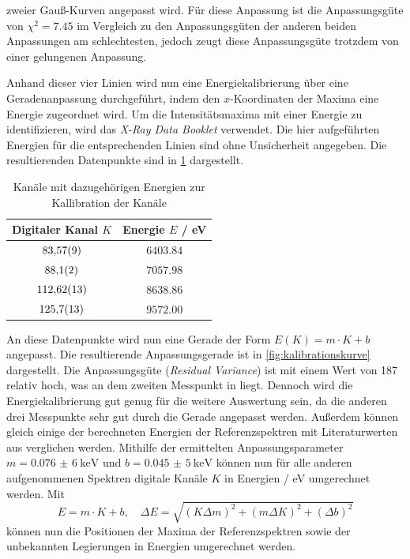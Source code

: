 zweier Gauß-Kurven angepasst wird. Für diese Anpassung ist die Anpassungsgüte von $\chi^2 = \num{7.45}$ im Vergleich zu den Anpassungsgüten der anderen
beiden Anpassungen am schlechtesten, jedoch zeugt diese Anpassungsgüte trotzdem von einer gelungenen Anpassung.\par
Anhand dieser vier Linien wird nun eine Energiekalibrierung über eine Geradenanpassung durchgeführt, indem den $x$-Koordinaten der Maxima eine
Energie zugeordnet wird. Um die Intensitätsmaxima mit einer Energie zu identifizieren, wird das \textit{X-Ray Data Booklet} \cite{xraydata} verwendet.
Die hier aufgeführten Energien für die entsprechenden Linien sind ohne Unsicherheit angegeben.
Die resultierenden Datenpunkte sind in \cref{tab:callibration} dargestellt.
\begin{table}[H]
   \centering
\caption{Kanäle mit dazugehörigen Energien zur Kallibration der Kanäle}
\begin{tabular}{c c}
\hline Digitaler Kanal $K$ & Energie $E$ / \unit{\electronvolt} \\ 
\hline
$\num{83.57\pm 0.09}$ & $\num{6403.84}$ \\
$\num{88.1\pm 0.2}$ & $\num{7057.98}$ \\
$\num{112.62\pm 0.13}$ & $\num{8638.86}$ \\
$\num{125.7\pm 1.3}$ & $\num{9572.00}$ \\
\hline\end{tabular}
\label{tab:callibration}
\end{table}
An diese Datenpunkte wird nun eine Gerade der Form $E(K) = m \cdot K + b$ angepasst. Die resultierende Anpassungsgerade ist in \cref{fig:kalibrationskurve}
dargestellt. Die Anpassungsgüte (\textit{Residual Variance}) ist mit einem Wert von 187 relativ hoch, was an dem zweiten Messpunkt in liegt.
Dennoch wird die Energiekalibrierung gut genug für die weitere Auswertung sein, da die anderen drei Messpunkte sehr gut durch die Gerade
angepasst werden. Außerdem können gleich einige der berechneten Energien der Referenzspektren mit Literaturwerten aus \cite{xraydata} verglichen werden.
Mithilfe der ermittelten Anpassungsparameter $m = \SI{0,076(6)}{\kilo \electronvolt}$ und $b = \SI{0,045(5)}{\kilo \electronvolt}$ können nun für alle anderen aufgenommenen Spektren digitale Kanäle $K$ in Energien
/ \unit{\electronvolt} umgerechnet werden. Mit
\begin{equation*}
    E = m \cdot K + b , \quad \Delta E = \sqrt{(K \Delta m)^2 + (m \Delta K)^2 + (\Delta b)^2}
\end{equation*} können nun die Positionen der Maxima der Referenzspektren sowie der unbekannten Legierungen in Energien umgerechnet werden.
